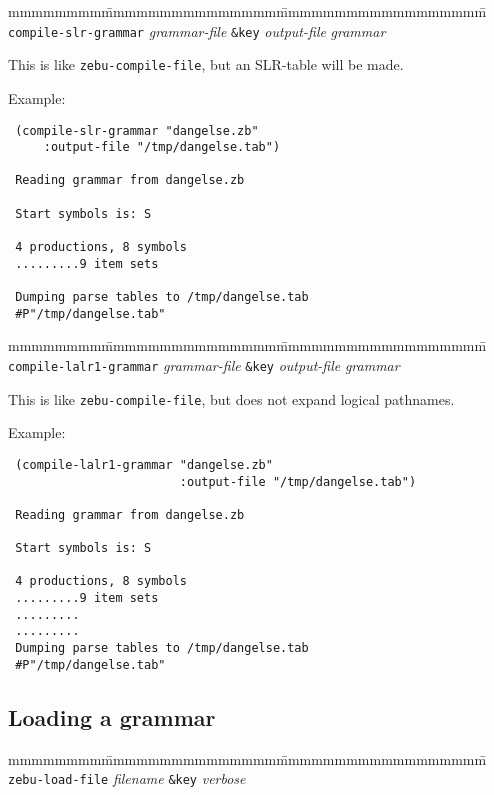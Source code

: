 \begin{tabbing}
mmmmmmmm\=mmmmmmmmmmmmmmm\=mmmmmmmmmmmmmmmmmm\=\kill
{\tt compile-slr-grammar} {\em grammar-file} {\tt \&key} {\em output-file} {\em grammar} \>\> 
\end{tabbing}

This is like {\tt zebu-compile-file}, but an SLR-table will be made.  

Example:
{\tt \begin{verbatim}
 (compile-slr-grammar "dangelse.zb" 
     :output-file "/tmp/dangelse.tab")

 Reading grammar from dangelse.zb
 
 Start symbols is: S

 4 productions, 8 symbols
 .........9 item sets

 Dumping parse tables to /tmp/dangelse.tab
 #P"/tmp/dangelse.tab"
     \end{verbatim}}

\begin{tabbing}
mmmmmmmm\=mmmmmmmmmmmmmmm\=mmmmmmmmmmmmmmmmmm\=\kill
{\tt compile-lalr1-grammar} {\em grammar-file} {\tt \&key} {\em output-file} {\em grammar} \>\> 
\end{tabbing}

This is like {\tt zebu-compile-file}, but does not expand logical pathnames.

Example:

{\tt \begin{verbatim}
 (compile-lalr1-grammar "dangelse.zb"
                        :output-file "/tmp/dangelse.tab")

 Reading grammar from dangelse.zb

 Start symbols is: S

 4 productions, 8 symbols
 .........9 item sets
 .........
 .........
 Dumping parse tables to /tmp/dangelse.tab
 #P"/tmp/dangelse.tab"
\end{verbatim}}

\subsection{Loading a grammar}

\begin{tabbing}
mmmmmmmm\=mmmmmmmmmmmmmmm\=mmmmmmmmmmmmmmmmmm\=\kill
{\tt zebu-load-file} {\em filename} {\tt \&key} {\em verbose} \>\> 
\end{tabbing}

